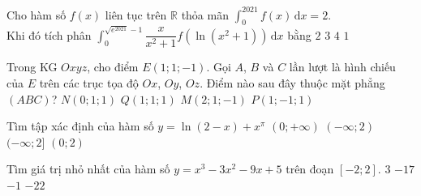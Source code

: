 \begin{ex}%
	Cho hàm số $f(x)$ liên tục trên $\mathbb{R}$ thỏa mãn $\displaystyle\int_{0}^{2021} f(x)\mathrm{\,d}x=2$.\\
	Khi đó tích phân $\displaystyle\int_{0}^{\sqrt{e^{2021}}-1}\dfrac{x}{x^{2}+1} f\left(\ln \left(x^{2}+1\right)\right)\mathrm{\,d}x$ bằng
	\choice
	{$2$}
	{$3$}
	{$4$}
	{\True $1$}
\end{ex}

\begin{ex}%
	Trong KG $Oxyz$, cho điểm $E(1; 1;-1)$. Gọi $A$, $B$ và $C$ lần lượt là hình chiếu của $E$ trên các trục tọa độ $Ox$, $Oy$, $Oz$. Điểm nào sau đây thuộc mặt phẳng $(ABC)$?
	\choice
	{$N(0; 1; 1)$}
	{\True $Q(1; 1; 1)$}
	{$M(2; 1;-1)$}
	{$P(1;-1; 1)$}
\end{ex}


\begin{ex}%
	Tìm tập xác định của hàm số $y=\ln (2-x)+{x}^{\pi}$
	\choice 
	{$(0;+\infty)$}
	{$(-\infty;2)$}
	{$(-\infty;2]$}
	{\True $(0;2)$}
\end{ex} 

\begin{ex}%
	Tìm giá trị nhỏ nhất của hàm số $y=x^3-3x^2-9x+5$ trên đoạn $[-2;2]$.
	\choice 
	{$3$}
	{\True $-17$}
	{$-1$}
	{$-22$}
\end{ex} 

